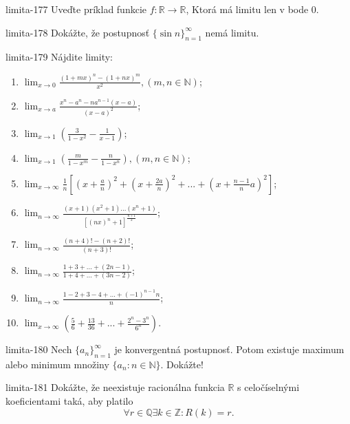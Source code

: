 \begin{defproblem}{limita-177}
Uveďte príklad funkcie $f: \mathbb{R} \rightarrow \mathbb{R}$, Ktorá má limitu len v bode $0$.
\end{defproblem}

\begin{defproblem}{limita-178}
Dokážte, že postupnosť ${\{\sin n\}}_{n=1}^\infty$ nemá limitu.
\end{defproblem}

\begin{defproblem}{limita-179}
Nájdite limity:
\begin{multicols}{2}
\begin{enumerate}
    \item $\lim_{x \rightarrow 0} \frac{(1+mx)^n-(1+nx)^m}{x^2},(m,n \in \mathbb{N})$;
    \item $\lim_{x \rightarrow a} \frac{x^n-a^n-na^{n-1}(x-a)}{(x-a)^2}$;
    \item $\lim_{x \rightarrow 1} (\frac{3}{1-x^2}-\frac{1}{x-1})$;
    \item $\lim_{x \rightarrow 1} (\frac{m}{1-x^m}-\frac{n}{1-x^n}),(m,n \in \mathbb{N})$;
    \item $\lim_{x \rightarrow \infty} \frac{1}{n}[(x+\frac{a}{n})^2+(x+\frac{2a}{n})^2+...+(x+\frac{n-1}{n}a)^2]$;
    \item $\lim_{n\rightarrow \infty} \frac{(x+1)(x^2+1)...(x^n+1)}{[(nx)^n+1]^{\frac{n+1}{2}}}$;
    \item $\lim_{n \rightarrow \infty} \frac{(n+4)!-(n+2)!}{(n+3)!}$;
    \item $\lim_{n \rightarrow \infty} \frac{1+3+...+(2n-1)}{1+4+...+(3n-2)}$;
    \item $\lim_{n \rightarrow \infty} \frac{1-2+3-4+...+(-1)^{n-1}n}{n}$;
    \item $\lim_{x \rightarrow \infty} (\frac{5}{6}+\frac{13}{36}+...+\frac{2^n-3^n}{6^n})$.
\end{enumerate}
\end{multicols}
\end{defproblem}

\begin{defproblem}{limita-180}
Nech ${\{a_n\}}_{n=1}^\infty$ je konvergentná postupnosť. Potom existuje maximum alebo minimum množiny $\{a_n: n \in \mathbb{N}\}$. Dokážte!
\end{defproblem}

\begin{defproblem}{limita-181}
Dokážte, že neexistuje racionálna funkcia $\mathbb{R}$ s celočíselnými koeficientami taká, aby platilo
$$\forall r \in \mathbb{Q} \exists k \in \mathbb{Z}: R(k)=r.$$
\end{defproblem}

